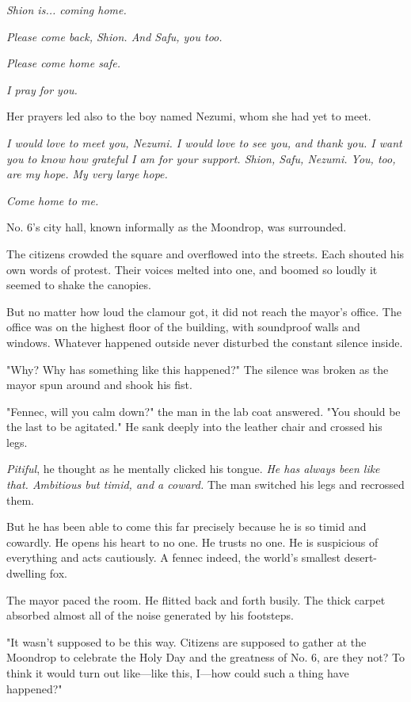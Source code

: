 \emph{Shion is... coming home.}

\emph{Please come back, Shion. And Safu, you too.}

\emph{Please come home safe.}

\emph{I pray for you.}

Her prayers led also to the boy named Nezumi, whom she had yet to meet.

\emph{I would love to meet you, Nezumi. I would love to see you, and thank
you. I want you to know how grateful I am for your support. Shion, Safu,
Nezumi. You, too, are my hope. My very large hope.}

\emph{Come home to me.}

\myspace

No. 6's city hall, known informally as the Moondrop, was surrounded.

The citizens crowded the square and overflowed into the streets. Each
shouted his own words of protest. Their voices melted into one, and
boomed so loudly it seemed to shake the canopies.

But no matter how loud the clamour got, it did not reach the mayor's
office. The office was on the highest floor of the building, with
soundproof walls and windows. Whatever happened outside never disturbed
the constant silence inside.

"Why? Why has something like this happened?" The silence was broken as
the mayor spun around and shook his fist.~

"Fennec, will you calm down?" the man in the lab coat answered. "You
should be the last to be agitated." He sank deeply into the leather
chair and crossed his legs.

\emph{Pitiful}, he thought as he mentally clicked his tongue. \emph{He has always
been like that. Ambitious but timid, and a coward.} The man switched his
legs and recrossed them.

But he has been able to come this far precisely because he is so timid
and cowardly. He opens his heart to no one. He trusts no one. He is
suspicious of everything and acts cautiously. A fennec indeed, the
world's smallest desert-dwelling fox.

The mayor paced the room. He flitted back and forth busily. The thick
carpet absorbed almost all of the noise generated by his footsteps.

"It wasn't supposed to be this way. Citizens are supposed to gather at
the Moondrop to celebrate the Holy Day and the greatness of No. 6, are
they not? To think it would turn out like---like this, I---how could such a
thing have happened?"

